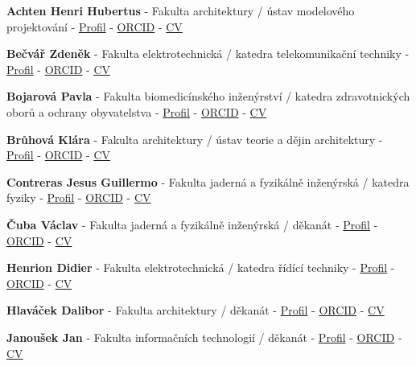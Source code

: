 \documentclass[11pt,a4paper]{article}
\newcommand{\memberComplete}[5]{%
  \item \textbf{#1} - #2 - \href{#3}{Profil} - \href{#4}{ORCID} - \href{#5}{CV}
}
\begin{document}
\begin{memberlist}

\memberComplete{Achten Henri Hubertus}
{Fakulta architektury / ústav modelového projektování}
{https://www.researchgate.net/profile/Henri-Achten}
{https://orcid.org/0000-0002-8255-3471}{https://drive.google.com/open?id=1ao94wDZLZLZPKhK5tD8_3oVke3_iVwSb}

\memberComplete{Bečvář Zdeněk}
{Fakulta elektrotechnická / katedra telekomunikační techniky}
{https://scholar.google.com/citations?user=SfxN77MAAAAJ}
{https://orcid.org/0000-0001-5155-8192}
{https://drive.google.com/open?id=1zdnGjAByL-PgimR1GBJdbvy0bOczBKHl}

\memberComplete{Bojarová Pavla}
{Fakulta biomedicínského inženýrství / katedra zdravotnických oborů a ochrany obyvatelstva}
{https://www.researchgate.net/profile/Pavla-Bojarova}
{https://orcid.org/0000-0001-7069-0973}
{https://drive.google.com/open?id=11HcpPM2sF_SCFHby_NG8P13x_rAlqKI2}

\memberComplete{Brůhová Klára}
{Fakulta architektury / ústav teorie a dějin architektury}
{https://www.fa.cvut.cz/en/faculty/people/419-klara-bruhova}
{https://orcid.org/0000-0002-3395-7832}
{https://drive.google.com/open?id=19NaVeTEQBywA5DJ6Tterhcfqkg9Sk81d}

\memberComplete{Contreras Jesus Guillermo}
{Fakulta jaderná a fyzikálně inženýrská / katedra fyziky}
{https://scholar.google.com/citations?user=nm-dvOQAAAAJ}
{https://orcid.org/0000-0002-9677-5294}
{https://drive.google.com/open?id=1WZLfe0dT9SWGJInxgLdPlmXFd4x3ury1}

\memberComplete{Čuba Václav}
{Fakulta jaderná a fyzikálně inženýrská / děkanát}
{https://fjfi.cvut.cz/en/people/cubavacl}
{https://orcid.org/0000-0002-6401-8117}
{https://drive.google.com/open?id=1ITiN9KFGPy-9_-cuoT1_LvXwN-ikG2ce}

\memberComplete{Henrion Didier}
{Fakulta elektrotechnická / katedra řídící techniky}
{https://scholar.google.com/citations?user=UME_UEYAAAAJ}
{https://orcid.org/0000-0001-6735-7715}
{https://drive.google.com/open?id=1VS-H2GFwAzyzS691OSrWS6UbR6s52s3L}

\memberComplete{Hlaváček Dalibor}
{Fakulta architektury / děkanát}
{https://www.fa.cvut.cz/en/faculty/people/309-dalibor-hlavacek}
{https://orcid.org/0000-0002-4409-2328}
{https://drive.google.com/open?id=1Sh43TnA6tRO7i4BmEH8NVhELzNHzKmWY}

\memberComplete{Janoušek Jan}
{Fakulta informačních technologií / děkanát}
{https://scholar.google.com/citations?user=tErNl4MAAAAJ}
{https://orcid.org/0000-0001-9329-1000}
{https://drive.google.com/open?id=1O0utXe_z2G4MBlEKqHipoGALYWELhZJu}


\end{memberlist}
\end{document}
